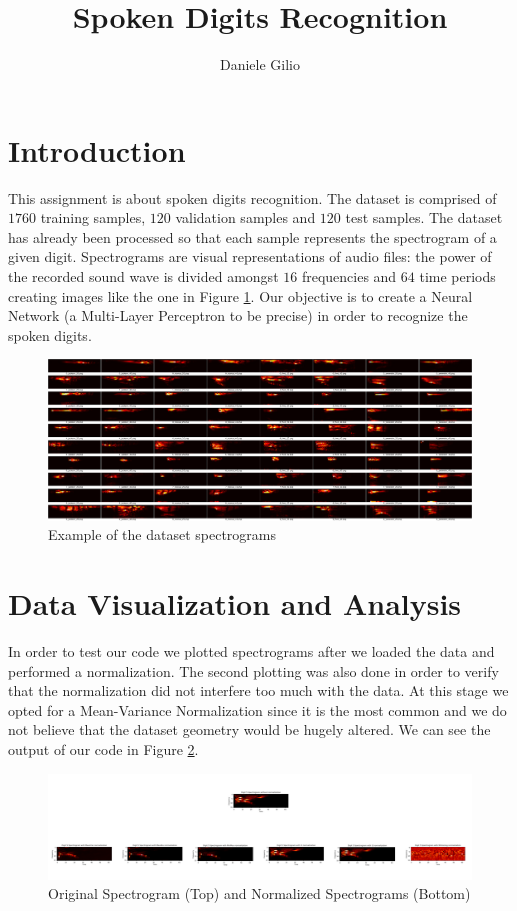 \documentclass[10pt,a4paper]{report}
\author{Daniele Gilio}
\title{Spoken Digits Recognition}
\begin{document}
\maketitle
\section{Introduction}
This assignment is about spoken digits recognition. The dataset is comprised of $1760$ training samples, $120$ validation samples and $120$ test samples. The dataset has already been processed so that each sample represents the spectrogram of a given digit. Spectrograms are visual representations of audio files: the power of the recorded sound wave is divided amongst $16$ frequencies and $64$ time periods creating images like the one in Figure \ref{fig:data_spect}. Our objective is to create a Neural Network (a Multi-Layer Perceptron to be precise) in order to recognize the spoken digits.
\begin{figure}[!ht]
\centering
\includegraphics[width=\linewidth]{spoken-digits/spectrograms.png}
\caption{Example of the dataset spectrograms}
\label{fig:data_spect}
\end{figure}
\section{Data Visualization and Analysis}
In order to test our code we plotted spectrograms after we loaded the data and performed a normalization. The second plotting was also done in order to verify that the normalization did not interfere too much with the data. At this stage we opted for a Mean-Variance Normalization since it is the most common and we do not believe that the dataset geometry would be hugely altered. We can see the output of our code in Figure \ref{fig:norm_spect}.
\begin{figure}[!ht]
\centering
\includegraphics[width=\linewidth]{norm_spect.png}
\caption{Original Spectrogram (Top) and Normalized Spectrograms (Bottom)}
\label{fig:norm_spect}
\end{figure}
\end{document}
